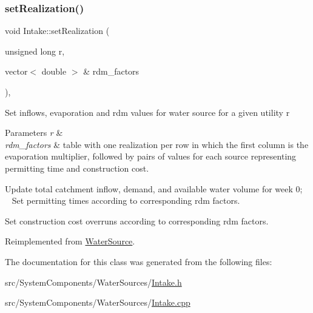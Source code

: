 \subsubsection{\texorpdfstring{set\+Realization()}{setRealization()}}
{\footnotesize\ttfamily void Intake\+::set\+Realization (\begin{DoxyParamCaption}\item[{unsigned long}]{r,  }\item[{vector$<$ double $>$ \&}]{rdm\+\_\+factors }\end{DoxyParamCaption})\hspace{0.3cm}{\ttfamily [override]}, {\ttfamily [virtual]}}

Set inflows, evaporation and rdm values for water source for a given utility r 
\begin{DoxyParams}{Parameters}
{\em r} & \\
\hline
{\em rdm\+\_\+factors} & table with one realization per row in which the first column is the evaporation multiplier, followed by pairs of values for each source representing permitting time and construction cost. \\
\hline
\end{DoxyParams}
Update total catchment inflow, demand, and available water volume for week 0; ~\newline
~\newline
 Set permitting times according to corresponding rdm factors.

Set construction cost overruns according to corresponding rdm factors. 

Reimplemented from \mbox{\hyperlink{classWaterSource_af72660e62fda45b6ae53da5f0afd86db}{Water\+Source}}.



The documentation for this class was generated from the following files\+:\begin{DoxyCompactItemize}
\item 
src/\+System\+Components/\+Water\+Sources/\mbox{\hyperlink{Intake_8h}{Intake.\+h}}\item 
src/\+System\+Components/\+Water\+Sources/\mbox{\hyperlink{Intake_8cpp}{Intake.\+cpp}}\end{DoxyCompactItemize}

